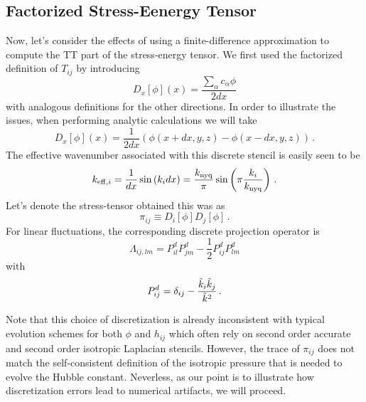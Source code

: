 \documentclass{revtex4}
\begin{document}
\subsection{Factorized Stress-Eenergy Tensor}
Now, let's consider the effects of using a finite-difference approximation to compute the TT part of the stress-energy tensor.
We first used the factorized definition of $T_{ij}$ by introducing
\begin{equation}
  D_x[\phi](x) = \frac{\sum_{\alpha}c_\alpha \phi}{2dx}
\end{equation}
with analogous definitions for the other directions.
In order to illustrate the issues, when performing analytic calculations we will take
\begin{equation}
  \label{eqn:deriv_order_1}
  D_x[\phi](x) = \frac{1}{2dx}\left(\phi(x+dx,y,z)-\phi(x-dx,y,z)\right) \, .
\end{equation}
The effective wavenumber associated with this discrete stencil is easily seen to be
\begin{equation}
  k_{{\rm eff},i} = \frac{1}{dx}\sin\left(k_idx\right) = \frac{k_{\rm nyq}}{\pi}\sin\left(\pi\frac{k_i}{k_{\rm nyq}}\right) \, .
\end{equation}
Let's denote the stress-tensor obtained this was as
\begin{equation}
  \label{eqn:tij_factor}
  \pi_{ij} \equiv D_i[\phi]D_j[\phi] \, .
\end{equation}
For linear fluctuations, the corresponding discrete projection operator is
\begin{equation}
  \Lambda_{ij,lm} = P^{d}_{il}P^{d}_{jm} - \frac{1}{2}P^d_{ij}P^{d}_{lm}
\end{equation}
with
\begin{equation}
  P^{d}_{ij} = \delta_{ij} - \frac{\tilde{k}_i\tilde{k}_j}{\tilde{k}^2} \, .
\end{equation}

Note that this choice of discretization is already inconsistent with typical evolution schemes for both $\phi$ and $h_{ij}$ which often rely on second order accurate and second order isotropic Laplacian stencils.   However, the trace of $\pi_{ij}$ does not match the self-consistent definition of the isotropic pressure that is needed to evolve the Hubble constant.
Neverless, as our point is to illustrate how discretization errors lead to numerical artifacts, we will proceed.
\end{document}

